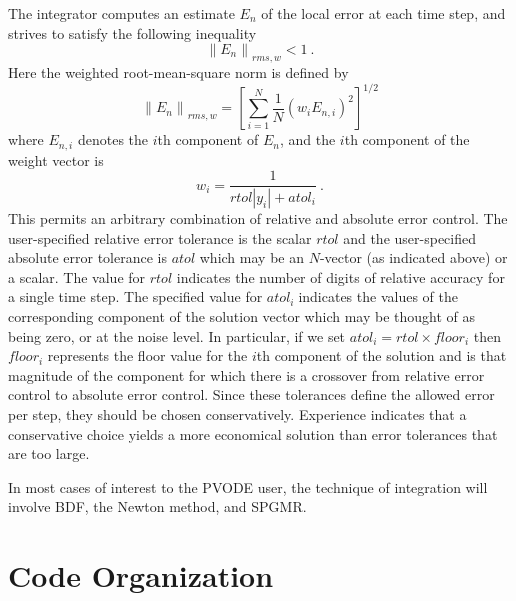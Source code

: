The integrator computes an estimate $E_{n}$ of the local error at each time
step, and strives to satisfy the following inequality
\begin{equation}
\left\| E_n\right\|_{rms,w} < 1 ~.  \label{Err}
\end{equation}
Here the weighted root-mean-square norm is defined by
\begin{equation}
\left\| E_n\right\|_{rms,w}=\left[ \sum_{i=1}^N\frac{1}{N}\left(
w_iE_{n,i}\right) ^2\right] ^{1/2}  \label{rms}
\end{equation}
where $E_{n,i}$ denotes the $i$th component of $E_n$, and the $i$th 
component of the weight vector is 
\begin{equation}
w_i=\frac{1}{rtol|y_i|+atol_i} ~.  \label{weight}
\end{equation}
This permits an arbitrary combination of relative and absolute error control.
The user-specified relative error tolerance is the scalar $rtol$ and the
user-specified absolute error tolerance is $atol$ which may be an $N$-vector
(as indicated above) or a scalar. The value for $rtol$
indicates the number of digits of relative accuracy for a single time step.
The specified value for $atol_{i}\;$indicates the values of the
corresponding component of the solution vector which may be thought of as
being zero, or at the noise level. In particular, if we set 
$atol_i=rtol\times floor_i$ then $floor_i$ represents the floor value for the 
$i$th component of the solution and is that magnitude of the component for
which there is a crossover from relative error control to absolute error
control. Since these tolerances define the allowed error per step, they
should be chosen conservatively. Experience indicates that a conservative
choice yields a more economical solution than error tolerances that are too
large.

In most cases of interest to the PVODE user, the technique of
integration will involve BDF, the Newton method, and SPGMR.

\section{Code Organization}

